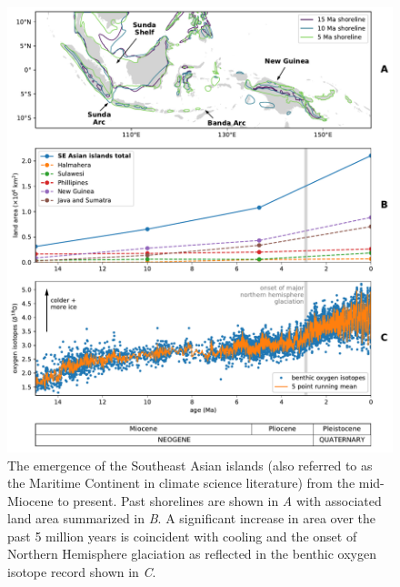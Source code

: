 \documentclass[9pt,twocolumn,twoside,lineno]{pnas-new}
\begin{document}
\begin{figure}
    \centering
    \includegraphics[width=13.0cm]{Figures/shoreline_growth.pdf}
    \caption{The emergence of the Southeast Asian islands (also referred to as the Maritime Continent in climate science literature) from the mid-Miocene to present. Past shorelines are shown in \textit{A} with associated land area summarized in \textit{B}. A significant increase in area over the past 5 million years is coincident with cooling and the onset of Northern Hemisphere glaciation as reflected in the benthic oxygen isotope record \cite{Zachos2008a} shown in \textit{C}.}
    \label{fig:shoreline_growth}
\end{figure}
\end{document}
